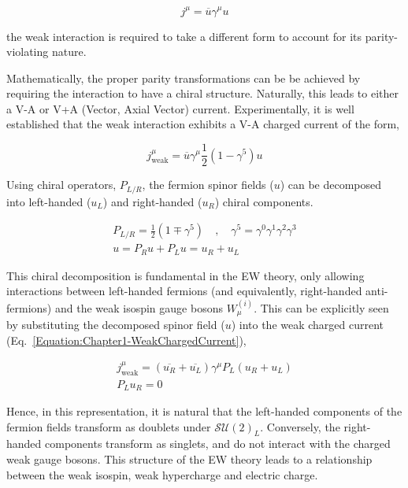 \begin{equation}
    j^\mu = \overline{u}\gamma^\mu u
\end{equation}

the weak interaction is required to take a different form to account for its parity-violating nature.

Mathematically, the proper parity transformations can be be achieved by requiring the interaction to have a chiral structure. Naturally, this leads to either a V-A or V+A (Vector, Axial Vector) current. Experimentally, it is well established that the weak interaction exhibits a V-A charged current of the form,

\begin{equation}
    j^\mu_{\text{weak}} = \overline{u}\gamma^\mu \frac{1}{2}(1-\gamma^5)u
\label{Equation:Chapter1-WeakChargedCurrent}
\end{equation}

Using chiral operators, $P_{L/R}$, the fermion spinor fields ($u$) can be decomposed into left-handed ($u_{L}$) and right-handed ($u_{R}$) chiral components. 

\begin{equation}
\begin{array}{c}
    P_{L/R} = \frac{1}{2}(1\mp \gamma^5) \quad ,\quad \gamma^5 = \gamma^0\gamma^1\gamma^2\gamma^3 \\
    u = P_Ru +P_Lu = u_R + u_L
\end{array}
\end{equation}

This chiral decomposition is fundamental in the EW theory, only allowing interactions between left-handed fermions (and equivalently, right-handed anti-fermions) and the weak isospin gauge bosons $W_{\mu}^{(i)}$. This can be explicitly seen by substituting the decomposed spinor field ($u$) into the weak charged current (Eq.~\ref{Equation:Chapter1-WeakChargedCurrent}),

\begin{equation}
\begin{array}{c}
    j^\mu_{\text{weak}} = (\overline{u_R} + \overline{u_L})\gamma^\mu P_L (u_R+u_L) \\
    P_L u_R = 0
\label{Equation:Chapter1-WeakChargedCurrent_Decomposed}
\end{array}
\end{equation}

Hence, in this representation, it is natural that the left-handed components of the fermion fields transform as doublets under $\mathcal{SU}(2)_L$. Conversely, the right-handed components transform as singlets, and do not interact with the charged weak gauge bosons. This structure of the EW theory leads to a relationship between the weak isospin, weak hypercharge and electric charge.

